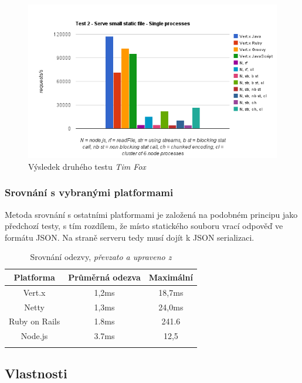 \begin{figure}[t]
\begin{centering}
\includegraphics[scale=0.7]{obrazky/chart_3-5}
\par\end{centering}
\caption{Výsledek druhého testu \emph{Tim Fox} \cite{benchmarkTim}\label{fig:test2}}
\end{figure}

\subsubsection{Srovnání s vybranými platformami}

Metoda srovnání s ostatními platformami je založená na podobném principu jako předchozí testy, s tím rozdílem, že místo statického souboru vrací odpověď ve formátu JSON. Na straně serveru tedy musí dojít k JSON serializaci.

\begin{flushleft}
\begin{longtable}{|c|c|c|}
\hline
\textsf{\textbf{Platforma}} & \textsf{\textbf{Průměrná odezva}} & \textsf{\textbf{Maximální}}\tabularnewline
\hline
Vert.x & 1,2ms & 18,7ms\tabularnewline
\hline 
Netty & 1,3ms & 24,0ms\tabularnewline
\hline
Ruby on Rails & 1.8ms & 241.6\tabularnewline
\hline 
Node.js & 3.7ms & 12,5\tabularnewline
\hline 

\caption{Srovnání odezvy, \emph{převzato a upraveno z} \cite{benchmark}}
\label{table:odezvy}
\end{longtable}
\end{flushleft}

\subsection{Vlastnosti}

